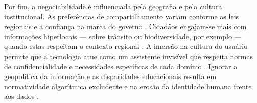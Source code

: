 \documentclass[
	12pt,				%
	oneside,			%
	a4paper,			%
	english,			%
	brazil				%
	]{abntex2ppgsi}
\begin{document}
    Por fim, a negociabilidade é influenciada pela geografia e pela cultura institucional. As preferências de compartilhamento variam conforme as leis regionais e a confiança na marca do governo \cite{coleti2024human, Theys2024, Bowyer2022, Calvetti2021173, Chatzimichali2021160}. Cidadãos engajam-se mais com informações hiperlocais — sobre trânsito ou biodiversidade, por exemplo — quando estas respeitam o contexto regional \cite{coleti2024human, Pereira, Xia2021, Chowdhury2016}. A imersão na cultura do usuário permite que a tecnologia atue como um assistente invisível que respeita normas de confidencialidade e necessidades específicas de cada domínio \cite{Capeleti2024Human, Strey2019Human, Seidelin2018}. Ignorar a geopolítica da informação e as disparidades educacionais resulta em normatividade algorítmica excludente e na erosão da identidade humana frente aos dados \cite{Briggs2021, Sailaja2021, Seidelin2018, Jandric2023}.
\end{document}

